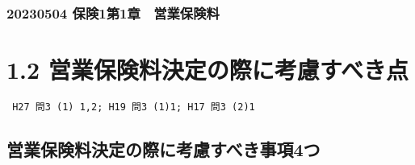\documentclass[]{article}
\begin{document}
\hypertarget{ux4fddux967a1ux7b2c1ux7ae0-ux55b6ux696dux4fddux967aux6599}{%
\subsubsection{20230504
保険1第1章　営業保険料}\label{ux4fddux967a1ux7b2c1ux7ae0-ux55b6ux696dux4fddux967aux6599}}

\hypertarget{ux55b6ux696dux4fddux967aux6599ux6c7aux5b9aux306eux969bux306bux8003ux616eux3059ux3079ux304dux70b9}{%
\section{1.2
営業保険料決定の際に考慮すべき点}\label{ux55b6ux696dux4fddux967aux6599ux6c7aux5b9aux306eux969bux306bux8003ux616eux3059ux3079ux304dux70b9}}

\begin{verbatim}
 H27 問3 (1) 1,2; H19 問3 (1)1; H17 問3 (2)1
\end{verbatim}

\hypertarget{ux55b6ux696dux4fddux967aux6599ux6c7aux5b9aux306eux969bux306bux8003ux616eux3059ux3079ux304dux4e8bux98054ux3064}{%
\subsection{営業保険料決定の際に考慮すべき事項4つ}\label{ux55b6ux696dux4fddux967aux6599ux6c7aux5b9aux306eux969bux306bux8003ux616eux3059ux3079ux304dux4e8bux98054ux3064}}
\end{document}
